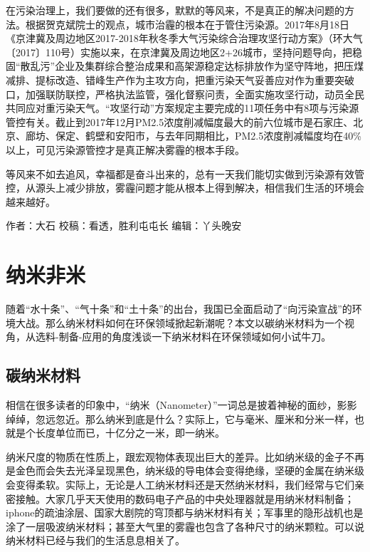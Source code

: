 \documentclass[]{book}
\begin{document}
在污染治理上，我们要做的还有很多，默默的等风来，不是真正的解决问题的方法。根据贺克斌院士的观点，城市治霾的根本在于管住污染源。2017年8月18日《京津冀及周边地区2017-2018年秋冬季大气污染综合治理攻坚行动方案》（环大气〔2017〕110号）实施以来，在京津冀及周边地区2+26城市，坚持问题导向，把稳固``散乱污''企业及集群综合整治成果和高架源稳定达标排放作为坚守阵地，把压煤减排、提标改造、错峰生产作为主攻方向，把重污染天气妥善应对作为重要突破口，加强联防联控，严格执法监管，强化督察问责，全面实施攻坚行动，动员全民共同应对重污染天气。``攻坚行动''方案规定主要完成的11项任务中有8项与污染源管控有关。截止到2017年12月PM2.5浓度削减幅度最大的前六位城市是石家庄、北京、廊坊、保定、鹤壁和安阳市，与去年同期相比，PM2.5浓度削减幅度均在40\%以上，可见污染源管控才是真正解决雾霾的根本手段。

等风来不如去追风，幸福都是奋斗出来的，总有一天我们能切实做到污染源有效管控，从源头上减少排放，雾霾问题才能从根本上得到解决，相信我们生活的环境会越来越好。

作者：大石
校稿：看透，胜利屯屯长
编辑：丫头晚安

\hypertarget{ux7eb3ux7c73ux975eux7c73}{%
\section{纳米非米}\label{ux7eb3ux7c73ux975eux7c73}}

随着``水十条''、``气十条''和``土十条''的出台，我国已全面启动了``向污染宣战''的环境大战。那么纳米材料如何在环保领域掀起新潮呢？本文以碳纳米材料为一个视角，从选料-制备-应用的角度浅谈一下纳米材料在环保领域如何小试牛刀。

\hypertarget{ux78b3ux7eb3ux7c73ux6750ux6599}{%
\subsection{碳纳米材料}\label{ux78b3ux7eb3ux7c73ux6750ux6599}}

相信在很多读者的印象中，``纳米（Nanometer）''一词总是披着神秘的面纱，影影绰绰，忽远忽近。那么纳米到底是什么？实际上，它与毫米、厘米和分米一样，也就是个长度单位而已，十亿分之一米，即一纳米。

纳米尺度的物质在性质上，跟宏观物体表现出巨大的差异。比如纳米级的金子不再是金色而会失去光泽呈现黑色，纳米级的导电体会变得绝缘，坚硬的金属在纳米级会变得柔软。实际上，无论是人工纳米材料还是天然纳米材料，我们经常与它们亲密接触。大家几乎天天使用的数码电子产品的中央处理器就是用纳米材料制备；iphone的疏油涂层、国家大剧院的穹顶都与纳米材料有关；军事里的隐形战机也是涂了一层吸波纳米材料；甚至大气里的雾霾也包含了各种尺寸的纳米颗粒。可以说纳米材料已经与我们的生活息息相关了。
\end{document}
